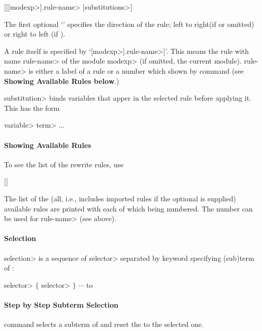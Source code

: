 [\kbd{+ | -}][\<modexp>].\<rule-name> [\<substitutions>]

The first optional `\kbd{+ | -}' specifies the direction of the rule; 
left to right(if \kbd{+} or omitted) or right to left (if \kbd{-}).

A rule itself is specified by `[\<modexp>].\<rule-name>]'. This means
the rule with name \<rule-name> of the module \<modexp> (if omitted, the
current module). \<rule-name> is either a label of a rule or a number 
which shown by  command (see {\bf Showing Available
  Rules below}.) 

\<substitution> binds variables that apper in the selected rule before 
applying it. This has the form

 \<variable> \kbd{=} \<term> \kbd{,} ...

\paragraph{Showing Available Rules}
To see the list of the rewrite rules, use

 [] 

The list of the (all, i.e., includes imported rules if the optional
 is supplied) available rules are printed with each of which
being numbered.  The number can be used for \<rule-name> (see above).

\paragraph{Selection}
\<selection> is a sequence of \<selector> separated by keyword
 specifying (sub)term of :

\<selector> $\{$  \<selector> $\}$ $\cdots$ 
\paralign to 

\paragraph{Step by Step Subterm Selection}
 command selects a subterm of  and reset
the  to the selected one.

